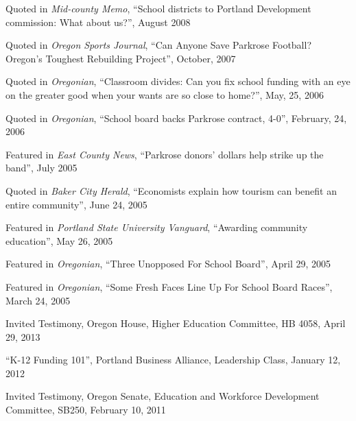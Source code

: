 \documentclass[Computer Science]{vita}
\begin{document}
\begin{vita}
\begin{Media Outreach}
  \item Quoted in \emph{Mid-county Memo}, ``School districts to
    Portland Development commission: What about us?'', August 2008

  \item Quoted in \emph{Oregon Sports Journal}, ``Can Anyone Save
    Parkrose Football?  Oregon's Toughest Rebuilding Project'',
    October, 2007

  \item Quoted in \emph{Oregonian}, ``Classroom divides: Can you fix
    school funding with an eye on the greater good when your wants are
    so close to home?'', May, 25, 2006

  \item Quoted in \emph{Oregonian}, ``School board backs Parkrose
    contract, 4-0'', February, 24, 2006

  \item Featured in \emph{East County News}, ``Parkrose donors'
    dollars help strike up the band'', July 2005

  \item Quoted in \emph{Baker City Herald}, ``Economists explain how
    tourism can benefit an entire community'', June 24, 2005
	
  \item Featured in \emph{Portland State University Vanguard},
    ``Awarding community education'', May 26, 2005
	
  \item Featured in \emph{Oregonian}, ``Three Unopposed For School
    Board'', April 29, 2005
	
  \item Featured in \emph{Oregonian}, ``Some Fresh Faces Line Up For
    School Board Races'', March 24, 2005

  \end{Media Outreach}

  \begin{Community Outreach}
  
  \item Invited Testimony, Oregon House, Higher Education Committee, HB 4058, April 29, 2013

\item ``K-12 Funding 101'', Portland Business Alliance, Leadership Class, January 12, 2012

\item Invited Testimony, Oregon Senate, Education and Workforce Development Committee, SB250, February 10, 2011 
  

\end{Community Outreach}
\end{vita}
\end{document}
